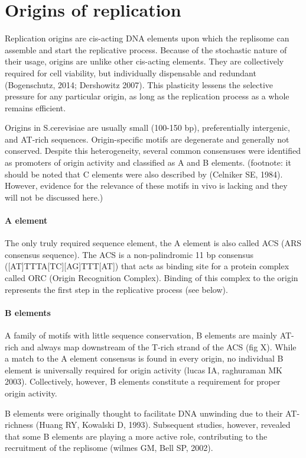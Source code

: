 \section{Origins of replication}

Replication origins are cis-acting DNA elements upon which the replisome can assemble and start the replicative process. Because of the stochastic nature of their usage, origins are unlike other cis-acting elements. They are collectively required for cell viability, but individually dispensable and redundant (Bogenschutz, 2014; Dershowitz 2007). This plasticity lessens the selective pressure for any particular origin, as long as the replication process as a whole remains efficient. 

Origins in S.cerevisiae are usually small (100-150 bp), preferentially intergenic, and AT-rich sequences. Origin-specific motifs are degenerate and generally not conserved. Despite this heterogeneity, several common consensuses were identified as promoters of origin activity and classified as A and B elements. (footnote: it should be noted that C elements were also described by (Celniker SE, 1984). However, evidence for the relevance of these motifs in vivo is lacking and they will not be discussed here.)

\paragraph{A element}
The only truly required sequence element, the A element is also called ACS (ARS consensus sequence). The ACS is a non-palindromic 11 bp consensus ([AT]TTTA[TC][AG]TTT[AT]) that acts as binding site for a protein complex called ORC (Origin Recognition Complex). Binding of this complex to the origin represents the first step in the replicative process (see below).

\paragraph{B elements}
A family of motifs with little sequence conservation, B elements are mainly AT-rich and always map downstream of the T-rich strand of the ACS (fig X). While a match to the A element consensus is found in every origin, no individual B element is universally required for origin activity (lucas IA, raghuraman MK  2003). Collectively, however, B elements constitute a requirement for proper origin activity.

B elements were originally thought to facilitate DNA unwinding due to their AT-richness (Huang RY, Kowalski D, 1993). Subsequent studies, however, revealed that some B elements are playing a more active role, contributing to the recruitment of the replisome (wilmes GM, Bell SP, 2002).

